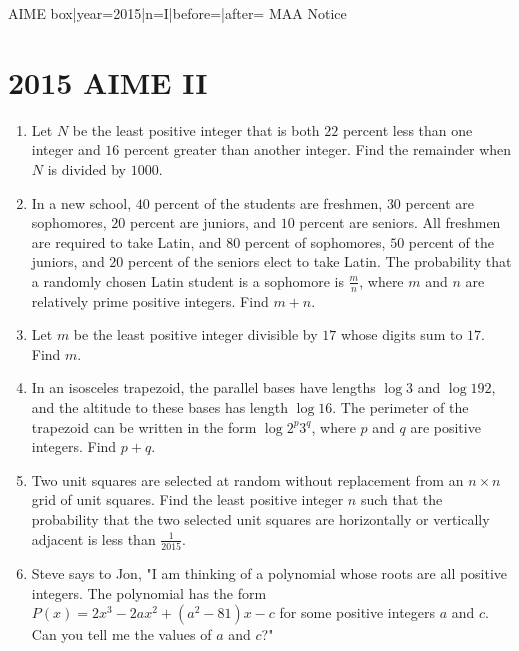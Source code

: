 \documentclass{article}
\begin{document}
\begin{enumerate}[label=\arabic*., itemsep=0.5em]
{{AIME box|year=2015|n=I|before=|after=}}
{{MAA Notice}}\par \vspace{0.5em}\end{enumerate}\newpage\section*{2015 AIME II}\begin{enumerate}[label=\arabic*., itemsep=0.5em]\item Let $N$ be the least positive integer that is both $22$ percent less than one integer and $16$ percent greater than another integer. Find the remainder when $N$ is divided by $1000$.\par \vspace{0.5em}\item In a new school, $40$ percent of the students are freshmen, $30$ percent are sophomores, $20$ percent are juniors, and $10$ percent are seniors. All freshmen are required to take Latin, and $80$ percent of sophomores, $50$ percent of the juniors, and $20$ percent of the seniors elect to take Latin. The probability that a randomly chosen Latin student is a sophomore is $\frac{m}{n}$, where $m$ and $n$ are relatively prime positive integers. Find $m+n$.\par \vspace{0.5em}\item Let $m$ be the least positive integer divisible by $17$ whose digits sum to $17$. Find $m$.\par \vspace{0.5em}\item In an isosceles trapezoid, the parallel bases have lengths $\log 3$ and $\log 192$, and the altitude to these bases has length $\log 16$. The perimeter of the trapezoid can be written in the form $\log 2^p 3^q$, where $p$ and $q$ are positive integers. Find $p + q$.\par \vspace{0.5em}\item Two unit squares are selected at random without replacement from an $n \times n$ grid of unit squares. Find the least positive integer $n$ such that the probability that the two selected unit squares are horizontally or vertically adjacent is less than $\frac{1}{2015}$.\par \vspace{0.5em}\item Steve says to Jon, "I am thinking of a polynomial whose roots are all positive integers. The polynomial has the form $P(x) = 2x^3-2ax^2+(a^2-81)x-c$ for some positive integers $a$ and $c$. Can you tell me the values of $a$ and $c$?"


\end{enumerate}
\end{document}
